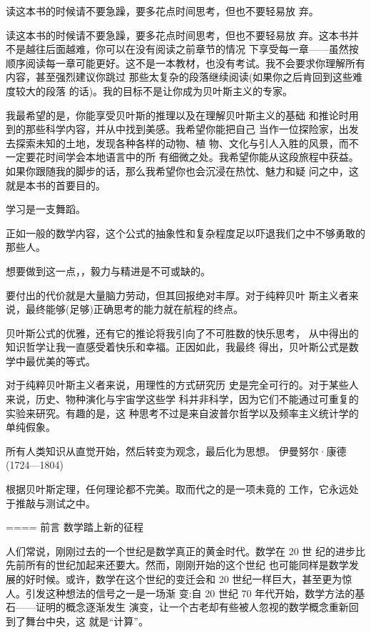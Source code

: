 读这本书的时候请不要急躁，要多花点时间思考，但也不要轻易放 弃。

读这本书的时候请不要急躁，要多花点时间思考，但也不要轻易放 弃。这本书并不是越往后面越难，你可以在没有阅读之前章节的情况 下享受每一章——虽然按顺序阅读每一章可能更好。这不是一本教材，也没有考试。我不会要求你理解所有内容，甚至强烈建议你跳过
那些太复杂的段落继续阅读(如果你之后肯回到这些难度较大的段落
的话)。我的目标不是让你成为贝叶斯主义的专家。

我最希望的是，你能享受贝叶斯的推理以及在理解贝叶斯主义的基础
和推论时用到的那些科学内容，并从中找到美感。我希望你能把自己
当作一位探险家，出发去探索未知的土地，发现各种各样的动物、植
物、文化与引人入胜的风景，而不一定要花时间学会本地语言中的所
有细微之处。我希望你能从这段旅程中获益。
如果你跟随我的脚步的话，那么我希望你也会沉浸在热忱、魅力和疑
问之中，这就是本书的首要目的。



学习是一支舞蹈。

正如一般的数学内容，这个公式的抽象性和复杂程度足以吓退我们之中不够勇敢的那些人。



想要做到这一点，，毅力与精进是不可或缺的。

要付出的代价就是大量脑力劳动，但其回报绝对丰厚。对于纯粹贝叶 斯主义者来说，最终能够(足够)正确思考的能力就在航程的终点。



贝叶斯公式的优雅，还有它的推论将我引向了不可胜数的快乐思考，
从中得出的知识哲学让我一直感受着快乐和幸福。正因如此，我最终
得出，贝叶斯公式是数学中最优美的等式。



对于纯粹贝叶斯主义者来说，用理性的方式研究历
史是完全可行的。对于某些人来说，历史、物种演化与宇宙学这些学
科并非科学，因为它们不能通过可重复的实验来研究。有趣的是，这
种思考不过是来自波普尔哲学以及频率主义统计学的单纯假象。



所有人类知识从直觉开始，然后转变为观念，最后化为思想。 伊曼努尔·康德(1724—1804)



根据贝叶斯定理，任何理论都不完美。取而代之的是一项未竟的
工作，它永远处于推敲与测试之中。





====
前言 数学踏上新的征程

人们常说，刚刚过去的一个世纪是数学真正的黄金时代。数学在 20 世 纪的进步比先前所有的世纪加起来还要大。然而，刚刚开始的这个世纪 也可能同样是数学发展的好时候。或许，数学在这个世纪的变迁会和 20 世纪一样巨大，甚至更为惊人。引发这种想法的信号之一是一场渐 变:自 20 世纪 70 年代开始，数学方法的基石——证明的概念逐渐发生 演变，让一个古老却有些被人忽视的数学概念重新回到了舞台中央，这 就是“计算”。

